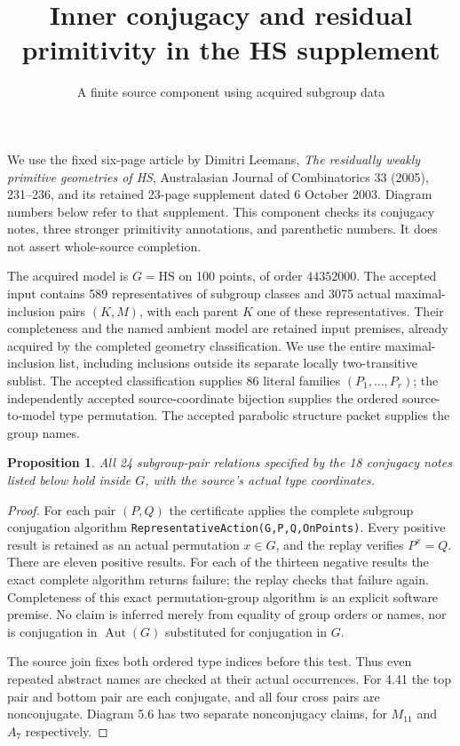 \documentclass[11pt]{article}
\title{Inner conjugacy and residual primitivity in the HS supplement}
\author{A finite source component using acquired subgroup data}
\date{}
\newtheorem{proposition}{Proposition}
\begin{document}
\maketitle
We use the fixed six-page article by Dimitri Leemans, \emph{The residually
weakly primitive geometries of HS}, Australasian Journal of Combinatorics
33 (2005), 231--236, and its retained 23-page supplement dated 6 October
2003. Diagram numbers below refer to that supplement. This component
checks its conjugacy notes, three stronger primitivity annotations, and
parenthetic numbers. It does not assert whole-source completion.

The acquired model is $G=\mathrm{HS}$ on 100 points, of order $44352000$.
The accepted input contains 589 representatives of subgroup classes and
3075 actual maximal-inclusion pairs $(K,M)$, with each parent $K$ one of
these representatives. Their completeness and the named ambient model
are retained input premises, already acquired by the completed geometry
classification. We use the entire maximal-inclusion list, including
inclusions outside its separate locally two-transitive sublist.
The accepted classification supplies 86 literal families
$(P_1,\ldots,P_r)$; the independently accepted source-coordinate
bijection supplies the ordered source-to-model type permutation.
The accepted parabolic structure packet supplies the group names.

\begin{proposition}
All 24 subgroup-pair relations specified by the 18 conjugacy notes listed
below hold inside $G$, with the source's actual type coordinates.
\end{proposition}
\begin{proof}
For each pair $(P,Q)$ the certificate applies the complete subgroup
conjugation algorithm \texttt{RepresentativeAction(G,P,Q,OnPoints)}.
Every positive result is retained as an actual permutation $x\in G$,
and the replay verifies $P^x=Q$. There are eleven positive results.
For each of the thirteen negative results the exact complete algorithm
returns failure; the replay checks that failure again. Completeness of
this exact permutation-group algorithm is an explicit software premise.
No claim is inferred merely from equality of group orders or names,
nor is conjugation in $\operatorname{Aut}(G)$ substituted for conjugation
in $G$.

The source join fixes both ordered type indices before this test. Thus
even repeated abstract names are checked at their actual occurrences.
For 4.41 the top pair and bottom pair are each conjugate, and all four
cross pairs are nonconjugate. Diagram 5.6 has two separate nonconjugacy
claims, for $M_{11}$ and $A_7$ respectively.
\end{proof}
\end{document}
